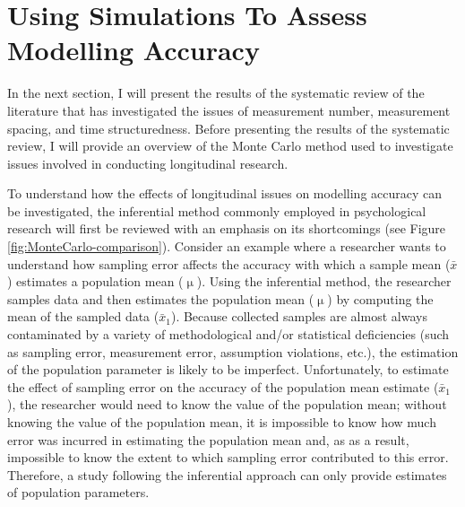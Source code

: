 \documentclass[
12pt, %
twoside,
english]{guelphthesis}
\begin{document}
\hypertarget{using-simulations-to-assess-modelling-accuracy}{%
\section{Using Simulations To Assess Modelling Accuracy}\label{using-simulations-to-assess-modelling-accuracy}}

In the next section, I will present the results of the systematic review of the literature that has investigated the issues of measurement number, measurement spacing, and time structuredness. Before presenting the results of the systematic review, I will provide an overview of the Monte Carlo method used to investigate issues involved in conducting longitudinal research.

To understand how the effects of longitudinal issues on modelling accuracy can be investigated, the inferential method commonly employed in psychological research will first be reviewed with an emphasis on its shortcomings (see Figure \ref{fig:MonteCarlo-comparison}). Consider an example where a researcher wants to understand how sampling error affects the accuracy with which a sample mean (\(\bar{x}\)) estimates a population mean (\(\upmu\)). Using the inferential method, the researcher samples data and then estimates the population mean (\(\upmu\)) by computing the mean of the sampled data (\(\bar{x}_1\)). Because collected samples are almost always contaminated by a variety of methodological and/or statistical deficiencies (such as sampling error, measurement error, assumption violations, etc.), the estimation of the population parameter is likely to be imperfect. Unfortunately, to estimate the effect of sampling error on the accuracy of the population mean estimate (\(\bar{x}_1\)), the researcher would need to know the value of the population mean; without knowing the value of the population mean, it is impossible to know how much error was incurred in estimating the population mean and, as as a result, impossible to know the extent to which sampling error contributed to this error. Therefore, a study following the inferential approach can only provide estimates of population parameters.
\end{document}
